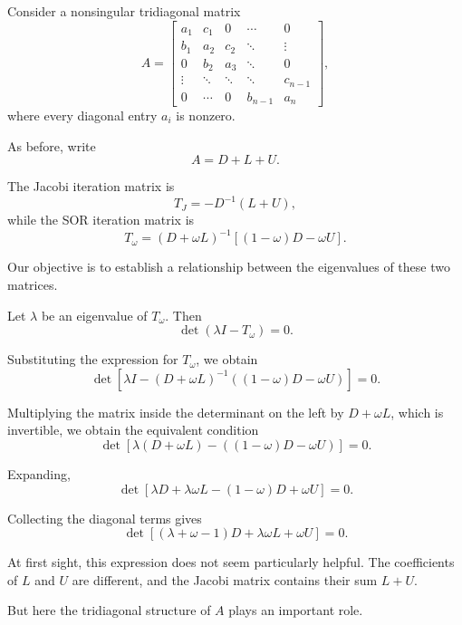 \documentclass[11pt,a4paper]{article}
\theoremstyle{definition}
\theoremstyle{remark}
\begin{document}
Consider a nonsingular tridiagonal matrix
\[
A=
\begin{bmatrix}
a_1 & c_1 & 0 & \cdots & 0\\
b_1 & a_2 & c_2 & \ddots & \vdots\\
0 & b_2 & a_3 & \ddots & 0\\
\vdots & \ddots & \ddots & \ddots & c_{n-1}\\
0 & \cdots & 0 & b_{n-1} & a_n
\end{bmatrix},
\]
where every diagonal entry $a_i$ is nonzero.

As before, write
\[
    A=D+L+U.
\]

The Jacobi iteration matrix is
\begin{equation}
    T_J=-D^{-1}(L+U),
    \label{eq:jacobi_matrix_optimal}
\end{equation}
while the SOR iteration matrix is
\begin{equation}
    T_\omega
    =
    (D+\omega L)^{-1}
    \left[(1-\omega)D-\omega U\right].
    \label{eq:sor_matrix_optimal}
\end{equation}

Our objective is to establish a relationship
between the eigenvalues of these two matrices.

Let $\lambda$ be an eigenvalue of $T_\omega$.
Then
\[
    \det(\lambda I-T_\omega)=0.
\]

Substituting the expression for $T_\omega$,
we obtain
\[
\det\left[
\lambda I-
(D+\omega L)^{-1}
\left((1-\omega)D-\omega U\right)
\right]=0.
\]

Multiplying the matrix inside the determinant
on the left by $D+\omega L$, which is invertible,
we obtain the equivalent condition
\[
\det\left[
\lambda(D+\omega L)
-
\left((1-\omega)D-\omega U\right)
\right]=0.
\]

Expanding,
\[
\det\left[
\lambda D+\lambda\omega L
-(1-\omega)D+\omega U
\right]=0.
\]

Collecting the diagonal terms gives
\begin{equation}
\boxed{
\det\left[
(\lambda+\omega-1)D
+\lambda\omega L+\omega U
\right]=0.
}
\label{eq:sor_characteristic_intermediate}
\end{equation}

At first sight, this expression does not seem
particularly helpful. The coefficients of $L$
and $U$ are different, and the Jacobi matrix
contains their sum $L+U$.

But here the tridiagonal structure of $A$
plays an important role.
\end{document}
